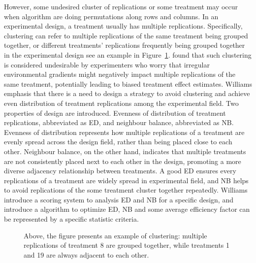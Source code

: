 \documentclass[
  a4paper,
  oneside,
  openany,
  12pt,
  onecolumn]{book}
\theoremstyle{definition}
\theoremstyle{definition}
\theoremstyle{plain}
\theoremstyle{remark}
\begin{document}
However, some undesired cluster of replications or some treatment may
occur when algorithm are doing permutations along rows and columns. In
an experimental design, a treatment usually has multiple replications.
Specifically, clustering can refer to multiple replications of the same
treatment being grouped together, or different treatments' replications
frequently being grouped together in the experimental design see an
example in Figure~\ref{fig-NBED}. \citet{piepho2018neighbor} found that
such clustering is considered undesirable by experimenters who worry
that irregular environmental gradients might negatively impact multiple
replications of the same treatment, potentially leading to biased
treatment effect estimates. Williams emphasis that there is a need to
design a strategy to avoid clustering and achieve even distribution of
treatment replications among the experimental field. Two properties of
design are introduced. Evenness of distribution of treatment
replications, abbreviated as ED, and neighbour balance, abbreviated as
NB. Evenness of distribution represents how multiple replications of a
treatment are evenly spread across the design field, rather than being
placed close to each other. Neighbour balance, on the other hand,
indicates that multiple treatments are not consistently placed next to
each other in the design, promoting a more diverse adjacency
relationship between treatments. A good ED ensures every replications of
a treatment are widely spread in experimental field, and NB helps to
avoid replications of the some treatment cluster together repeatedly.
Williams introduce a scoring system to analysis ED and NB for a specific
design, and introduce a algorithm to optimize ED, NB and some average
efficiency factor can be represented by a specific statistic criteria.

\begin{figure}


\caption{\label{fig-NBED}Above, the figure presents an example of
clustering: multiple replications of treatment 8 are grouped together,
while treatments 1 and 19 are always adjacent to each other.}

\end{figure}%
\end{document}
